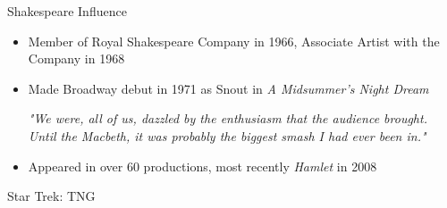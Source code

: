 \documentclass[xcolor=dvipsnames]{beamer}
\begin{document}
\begin{frame}{Shakespeare Influence}
  \begin{itemize}
    \item Member of Royal Shakespeare Company in 1966, Associate Artist with the Company in 1968
    \item Made Broadway debut in 1971 as Snout in \emph{A Midsummer's Night Dream}
    \begin{qct}
      \emph{"We were, all of us, dazzled by the enthusiasm that the audience
      brought. Until the Macbeth, it was probably the biggest smash I had ever
      been in."}
    \end{qct}
    \item Appeared in over 60 productions, most recently \emph{Hamlet} in 2008
  \end{itemize}
\end{frame}

\begin{frame}{Star Trek: TNG}

\end{frame}
\end{document}

